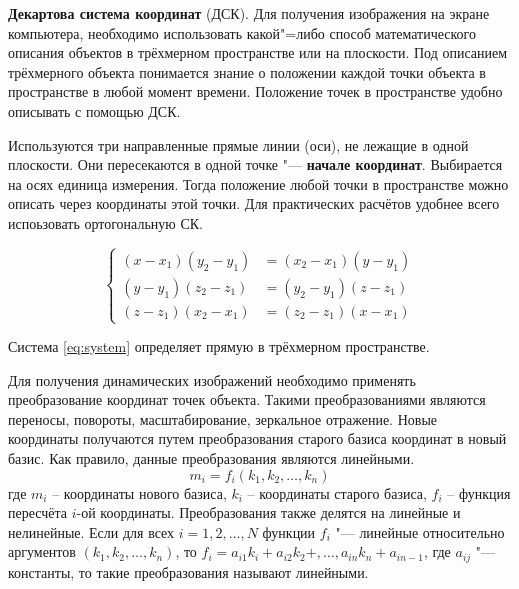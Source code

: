 \textbf{Декартова система координат} (ДСК). Для получения изображения на экране компьютера, необходимо использовать какой"=либо способ математического описания объектов в трёхмерном пространстве или на плоскости. Под описанием трёхмерного объекта понимается знание о положении каждой точки объекта в пространстве в любой момент времени. Положение точек в пространстве удобно описывать с помощью ДСК.

Используются три направленные прямые линии (оси), не лежащие в одной плоскости. Они пересекаются в одной точке "--- \textbf{начале координат}. Выбирается на осях единица измерения. Тогда положение любой точки в пространстве можно описать через координаты этой точки. Для практических расчётов удобнее всего испоьзовать ортогональную СК.

\begin{equation}\label{eq:system}
    \left\{
    \begin{aligned}
    (x - x_{1})(y_{2} - y_{1}) &= (x_{2} - x_{1})(y - y_{1}) \\
    (y - y_{1})(z_{2} - z_{1}) &= (y_{2} - y_{1})(z - z_{1}) \\
    (z - z_{1})(x_{2} - x_{1}) &= (z_{2} - z_{1})(x - x_{1})
    \end{aligned}
    \right.
\end{equation}

Система \ref{eq:system} определяет прямую в трёхмерном пространстве.

Для получения динамических изображений необходимо применять преобразование координат точек объекта. Такими преобразованиями являются переносы, повороты, масштабирование, зеркальное отражение. Новые координаты получаются путем преобразования старого базиса координат в новый базис. Как правило, данные преобразования являются линейными. 
\begin{equation}
    m_{i} = f_{i}(k_{1}, k_{2}, \ldots, k_{n})
\end{equation}
где $m_{i}$ – координаты нового базиса, $k_{i}$ – координаты старого базиса, $f_{i}$ – функция пересчёта $i$-ой координаты. Преобразования также делятся на линейные и нелинейные. Если для всех $i = 1, 2, \ldots, N$ функции $f_{i}$ "--- линейные относительно аргументов $(k_{1}, k_{2}, \ldots, k_{n})$, то $f_{i} = a_{i1}k_{i} + a_{i2}k_{2} +, \ldots, a_{in}k_{n} + a_{in-1}$, где $a_{ij}$ "--- константы, то такие преобразования называют линейными. 

